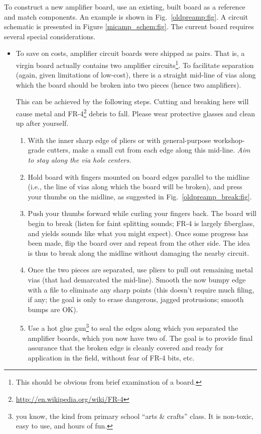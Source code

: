 \documentclass[letterpaper]{article}
\begin{document}
To construct a new amplifier board, use an existing, built board as a
reference and match components. An example is shown in
Fig.~\ref{oldpreamp:fig}. A circuit schematic is presented in Figure
\ref{micamp_schem:fig}. The current board requires several special
considerations.
\begin{itemize}
\item To save on costs, amplifier circuit boards were shipped as
  pairs. That is, a virgin board actually contains two amplifier
  circuits\footnote{This should be obvious from brief examination of a
    board.}. To facilitate separation (again, given limitations of
  low-cost), there is a straight mid-line of vias along which the
  board should be broken into two pieces (hence two amplifiers). 

This can be achieved by the following steps. Cutting and breaking here
will cause metal and
FR-4\footnote{\url{http://en.wikipedia.org/wiki/FR-4}} debris to
fall. Please wear protective glasses and clean up after yourself.
\begin{enumerate}
\item With the inner sharp edge of pliers or with general-purpose
  workshop-grade cutters, make a small cut from each edge along this
  mid-line. \textit{Aim to stay along the via hole centers.}

\item Hold board with fingers mounted on board edges parallel to the
  midline (i.e., the line of vias along which the board will be
  broken), and press your thumbs on the midline, as suggested in
  Fig.~\ref{oldpreamp_break:fig}.

\item Push your thumbs forward while curling your fingers back. The
  board will begin to break (listen for faint splitting sounds; FR-4
  is largely fiberglass, and yields sounds like what you might
  expect). Once some progress has been made, flip the board over and
  repeat from the other side. The idea is thus to break along the
  midline without damaging the nearby circuit.

\item Once the two pieces are separated, use pliers to pull out
  remaining metal vias (that had demarcated the mid-line). Smooth the
  now bumpy edge with a file to eliminate any sharp points (this
  doesn't require much filing, if any; the goal is only to erase
  dangerous, jagged protrusions; smooth bumps are OK).

\item Use a hot glue gun\footnote{you know, the kind from primary
  school ``arts \& crafts'' class. It is non-toxic, easy to use, and
  hours of fun.} to seal the edges along which you separated the
  amplifier boards, which you now have two of. The goal is to provide
  final assurance that the broken edge is cleanly covered and ready
  for application in the field, without fear of FR-4 bits, etc.


\end{enumerate}
\end{itemize}
\end{document}
